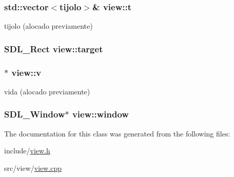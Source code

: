 \subsubsection[{\texorpdfstring{t}{t}}]{\setlength{\rightskip}{0pt plus 5cm}std\+::vector$<${\bf tijolo}$>$\& view\+::t\hspace{0.3cm}{\ttfamily [private]}}\hypertarget{classview_af57a3852a171948382275c534ede7987}{}\label{classview_af57a3852a171948382275c534ede7987}
tijolo (alocado previamente) 
\subsubsection[{\texorpdfstring{target}{target}}]{\setlength{\rightskip}{0pt plus 5cm}S\+D\+L\+\_\+\+Rect view\+::target\hspace{0.3cm}{\ttfamily [private]}}\hypertarget{classview_a49a628eedba666db008f8c07b96e3a51}{}\label{classview_a49a628eedba666db008f8c07b96e3a51}
\subsubsection[{\texorpdfstring{v}{v}}]{$\ast$ view\+::v\hspace{0.3cm}{\ttfamily [private]}}\hypertarget{classview_ae0f8e281f5f7937d84f435437ce03546}{}\label{classview_ae0f8e281f5f7937d84f435437ce03546}
vida (alocado previamente) 
\subsubsection[{\texorpdfstring{window}{window}}]{\setlength{\rightskip}{0pt plus 5cm}S\+D\+L\+\_\+\+Window$\ast$ view\+::window\hspace{0.3cm}{\ttfamily [private]}}\hypertarget{classview_ade09c2dbabd1bf59ffaf625156c514f0}{}\label{classview_ade09c2dbabd1bf59ffaf625156c514f0}


The documentation for this class was generated from the following files\+:\begin{DoxyCompactItemize}
\item 
include/\hyperlink{view_8h}{view.\+h}\item 
src/view/\hyperlink{view_8cpp}{view.\+cpp}\end{DoxyCompactItemize}

